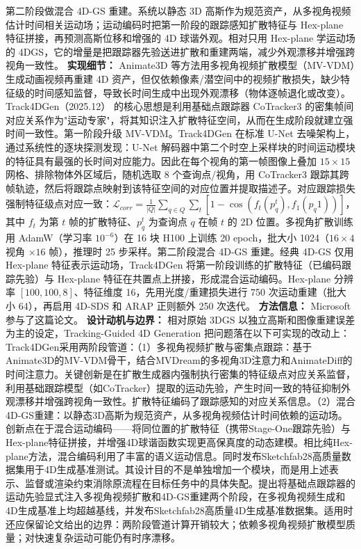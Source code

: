 第二阶段做混合 4D-GS 重建。系统以静态 3D 高斯作为规范资产，从多视角视频估计时间相关运动场；运动编码时把第一阶段的跟踪感知扩散特征与 Hex-plane 特征拼接，再预测高斯位移和增强的 4D 球谐外观。相对只用 Hex-plane 学运动场的 4DGS，它的增量是把跟踪器先验送进扩散和重建两端，减少外观漂移并增强跨视角一致性。
\textbf{实现细节：} Animate3D 等方法用多视角视频扩散模型（MV-VDM）生成动画视频再重建 4D 资产，但仅依赖像素/潜空间中的视频扩散损失，缺少特征级的时间感知监督，导致长时间生成中出现外观漂移（物体逐帧退化或改变）。Track4DGen（2025.12） 的核心思想是利用基础点跟踪器 CoTracker3 的密集帧间对应关系作为"运动专家"，将其知识注入扩散特征空间，从而在生成阶段就建立强时间一致性。第一阶段升级 MV-VDM。Track4DGen 在标准 U-Net 去噪架构上，通过系统性的逐块探测发现：U-Net 解码器中第二个时空上采样块的时间运动模块的特征具有最强的长时间对应能力。因此在每个视角的第一帧图像上叠加 $15 \times 15$ 网格、排除物体外区域后，随机选取 8 个查询点/视角，用 CoTracker3 跟踪其跨帧轨迹，然后将跟踪点映射到该特征空间的对应位置并提取描述子。对应跟踪损失强制特征级点对应一致：$\mathcal{L}_{corr} = \frac{1}{|Q|}\sum_{q \in Q} \sum_{t} [1 - \cos(f_t(p_q^t), f_1(p_q^{}1))]$，其中 $f_t$ 为第 $t$ 帧的扩散特征、$p_q^t$ 为查询点 $q$ 在帧 $t$ 的 2D 位置。多视角扩散训练用 AdamW（学习率 $10^{-6}$）在 16 块 H100 上训练 20 epoch，批大小 1024（$16 \times 4$ 视角 $\times 16$ 帧），推理时 25 步采样。第二阶段混合 4D-GS 重建。经典 4D-GS 仅用 Hex-plane 特征表示运动场，Track4DGen 将第一阶段训练的扩散特征（已编码跟踪先验）与 Hex-plane 特征在共置点上拼接，形成混合运动编码。Hex-plane 分辨率 $[100, 100, 8]$、特征维度 16，先用光度/重建损失进行 750 次运动重建（批大小 64），再启用 4D-SDS 和 ARAP 正则额外 250 次迭代。
\textbf{方法信息：} Microsoft 参与了这篇论文。
\textbf{设计动机与边界：} 相对原始 3DGS 以独立高斯和图像重建误差为主的设定，Tracking-Guided 4D Generation 把问题落在以下可实现的改动上：Track4DGen采用两阶段管道：（1）多视角视频扩散与密集点跟踪：基于Animate3D的MV-VDM骨干，结合MVDream的多视角3D注意力和AnimateDiff的时间注意力。关键创新是在扩散生成器内强制执行密集的特征级点对应关系监督，利用基础跟踪模型（如CoTracker）提取的运动先验，产生时间一致的特征抑制外观漂移并增强跨视角一致性。扩散特征编码了跟踪感知的对应关系信息。（2）混合4D-GS重建：以静态3D高斯为规范资产，从多视角视频估计时间依赖的运动场。创新点在于混合运动编码——将同位置的扩散特征（携带Stage-One跟踪先验）与Hex-plane特征拼接，并增强4D球谐函数实现更高保真度的动态建模。相比纯Hex-plane方法，混合编码利用了丰富的语义运动信息。同时发布Sketchfab28高质量数据集用于4D生成基准测试。其设计目的不是单独增加一个模块，而是用上述表示、监督或渲染约束消除原流程在目标任务中的具体失配。提出将基础点跟踪器的运动先验显式注入多视角视频扩散和4D-GS重建两个阶段，在多视角视频生成和4D生成基准上均超越基线，并发布Sketchfab28高质量4D生成基准数据集。适用时还应保留论文给出的边界：两阶段管道计算开销较大；依赖多视角视频扩散模型质量；对快速复杂运动可能仍有时序漂移。
